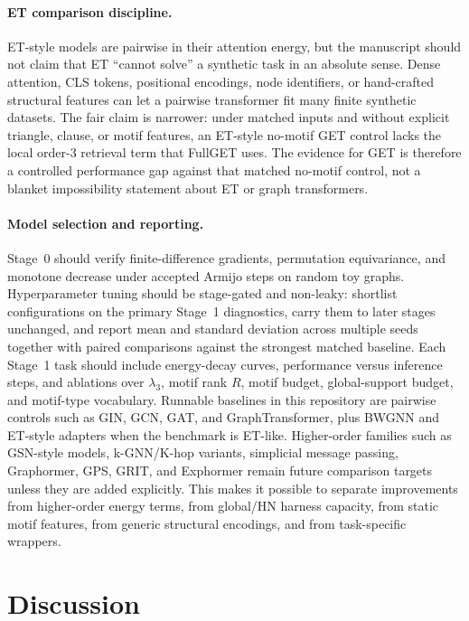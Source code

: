 \documentclass[11pt,a4paper]{article}
\begin{document}
\paragraph{ET comparison discipline.}
ET-style models are pairwise in their attention energy, but the manuscript
should not claim that ET ``cannot solve'' a synthetic task in an absolute
sense. Dense attention, CLS tokens, positional encodings, node identifiers, or
hand-crafted structural features can let a pairwise transformer fit many
finite synthetic datasets. The fair claim is narrower: under matched inputs
and without explicit triangle, clause, or motif features, an ET-style no-motif
GET control lacks the local order-3 retrieval term that FullGET uses.
The evidence for GET is therefore a controlled performance gap against that
matched no-motif control, not a blanket impossibility statement about ET or
graph transformers.

\paragraph{Model selection and reporting.}
Stage~0 should verify finite-difference gradients, permutation equivariance,
and monotone decrease under accepted Armijo steps on random toy graphs.
Hyperparameter tuning should be stage-gated and non-leaky: shortlist
configurations on the primary Stage~1 diagnostics, carry them to later stages
unchanged, and report mean and standard deviation across multiple seeds
together with paired comparisons against the strongest matched baseline. Each
Stage~1 task should include energy-decay curves, performance versus inference
steps, and ablations over $\lambda_3$, motif rank $R$, motif budget,
global-support budget, and motif-type vocabulary. Runnable baselines in this
repository are pairwise controls such as GIN, GCN, GAT, and GraphTransformer,
plus BWGNN and ET-style adapters when the benchmark is ET-like. Higher-order
families such as GSN-style models, k-GNN/K-hop variants, simplicial message
passing, Graphormer, GPS, GRIT, and Exphormer remain future comparison targets
unless they are added explicitly. This makes it possible to separate
improvements from higher-order energy terms, from global/HN harness capacity,
from static motif features, from generic structural encodings, and from
task-specific wrappers.

\section{Discussion}
\end{document}
